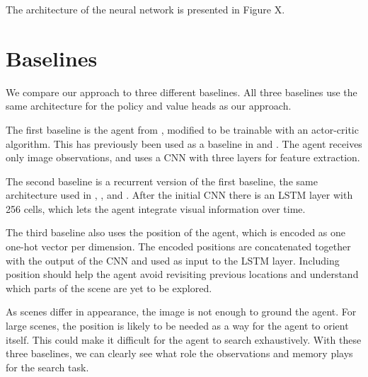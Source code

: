 The architecture of the neural network is presented in Figure X.



\section{Baselines}
\label{sec:baseline}

We compare our approach to three different baselines.
All three baselines use the same architecture for the policy and value heads as our approach.

The first baseline is the agent from \cite{mnih_human_2015}, modified to be trainable with an actor-critic algorithm.
This has previously been used as a baseline in \cite{mirowski_navigate_2017} and \cite{cobbe_procgen_2020}.
The agent receives only image observations, and uses a CNN with three layers for feature extraction.

The second baseline is a recurrent version of the first baseline, the same architecture used in \cite{mnih_asynchronous_2016}, \cite{mirowski_navigate_2017}, and \cite{gupta_cognitive_2019}.
After the initial CNN there is an LSTM layer with 256 cells,
which lets the agent integrate visual information over time.

The third baseline also uses the position of the agent, which is encoded as one one-hot vector per dimension. 
The encoded positions are concatenated together with the output of the CNN and used as input to the LSTM layer.
Including position should help the agent avoid revisiting previous locations and understand which parts of the scene are yet to be explored. 

As scenes differ in appearance, the image is not enough to ground the agent.
For large scenes, the position is likely to be needed as a way for the agent to orient itself.
This could make it difficult for the agent to search exhaustively.
With these three baselines, we can clearly see what role the observations and memory plays for the search task.

